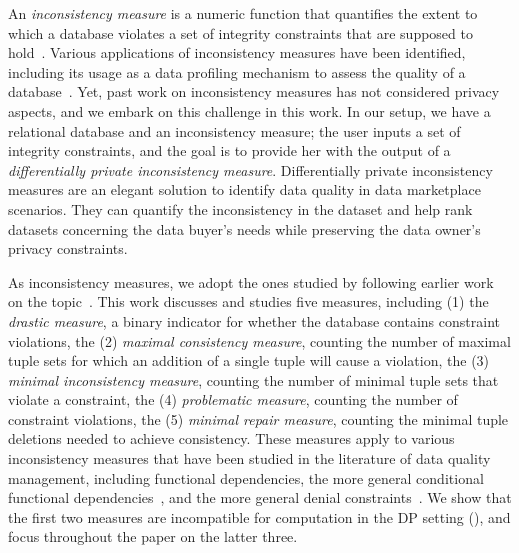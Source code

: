 {An \emph{inconsistency measure} is a numeric function that quantifies the extent to which a database violates a set of integrity constraints that are supposed to hold~\cite{thimm2017compliance, parisi2019inconsistency, 
DBLP:conf/sum/Bertossi18,DBLP:conf/ecsqaru/GrantH13,DBLP:journals/ijar/GrantH23,LivshitsBKS20}.
Various applications of inconsistency measures have been identified, including its usage as a data profiling mechanism to assess the quality of a database~\cite{LivshitsKTIKR21,LivshitsK22}. 
Yet, past work on inconsistency measures has not considered privacy aspects, and we embark on this challenge in this work.  In our setup, we have a relational database and an inconsistency measure; the user inputs a set of integrity constraints, and the goal is to provide her with the output of a \emph{differentially private inconsistency measure}. Differentially private inconsistency measures are an elegant solution to identify data quality in data marketplace scenarios. They can quantify the inconsistency in the dataset and help rank datasets concerning the data buyer's needs while preserving the data owner's privacy constraints. 
}

As inconsistency measures, we adopt the ones studied by \citet{LivshitsKTIKR21} following earlier work on the topic~\cite{thimm2017compliance, parisi2019inconsistency, 
DBLP:conf/sum/Bertossi18,DBLP:conf/ecsqaru/GrantH13}.
This work discusses and studies five measures, including (1) the {\em drastic measure}, a binary indicator for whether the database contains constraint violations, the (2) \emph{maximal consistency measure}, counting the number of maximal tuple sets for which an addition of a single tuple will cause a violation, the (3) {\em minimal inconsistency measure}, counting the number of minimal tuple sets that violate a constraint, 
the (4) \emph{problematic measure}, counting the number of constraint violations, the (5) \emph{minimal repair measure}, counting the minimal tuple deletions needed to achieve consistency. 
These measures apply to various inconsistency measures that have been studied in the literature of data quality management, including functional dependencies, the more general conditional functional dependencies~\cite{bohannon2007conditional}, and the more general denial constraints~\cite{ChomickiM05}.
We show that the first two measures are incompatible for computation in the DP setting (), and focus throughout the paper on the latter three. 

